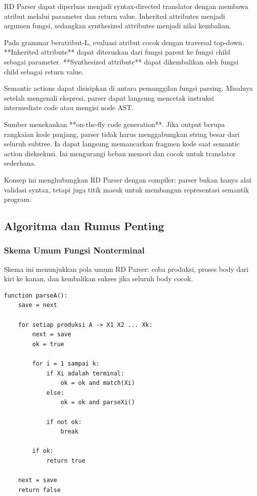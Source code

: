 \begin{jawab}
RD Parser dapat diperluas menjadi syntax-directed translator dengan membawa atribut melalui parameter dan return value. Inherited attributes menjadi argumen fungsi, sedangkan synthesized attributes menjadi nilai kembalian.
\end{jawab}

Pada grammar beratribut-L, evaluasi atribut cocok dengan traversal top-down. **Inherited attribute** dapat diteruskan dari fungsi parent ke fungsi child sebagai parameter. **Synthesized attribute** dapat dikembalikan oleh fungsi child sebagai return value.

Semantic actions dapat disisipkan di antara pemanggilan fungsi parsing. Misalnya setelah mengenali ekspresi, parser dapat langsung mencetak instruksi intermediate code atau mengisi node AST.

Sumber menekankan **on-the-fly code generation**. Jika output berupa rangkaian kode panjang, parser tidak harus menggabungkan string besar dari seluruh subtree. Ia dapat langsung memancarkan fragmen kode saat semantic action dieksekusi. Ini mengurangi beban memori dan cocok untuk translator sederhana.

Konsep ini menghubungkan RD Parser dengan compiler: parser bukan hanya alat validasi syntax, tetapi juga titik masuk untuk membangun representasi semantik program.

\subsection{Algoritma dan Rumus Penting}

\subsubsection{Skema Umum Fungsi Nonterminal}

\begin{jawab}
Skema ini menunjukkan pola umum RD Parser: coba produksi, proses body dari kiri ke kanan, dan kembalikan sukses jika seluruh body cocok.
\end{jawab}

\begin{lstlisting}[caption={Skema umum fungsi nonterminal recursive descent}, label={lst:rd-generic}]
function parseA():
    save = next

    for setiap produksi A -> X1 X2 ... Xk:
        next = save
        ok = true

        for i = 1 sampai k:
            if Xi adalah terminal:
                ok = ok and match(Xi)
            else:
                ok = ok and parseXi()

            if not ok:
                break

        if ok:
            return true

    next = save
    return false
\end{lstlisting}

